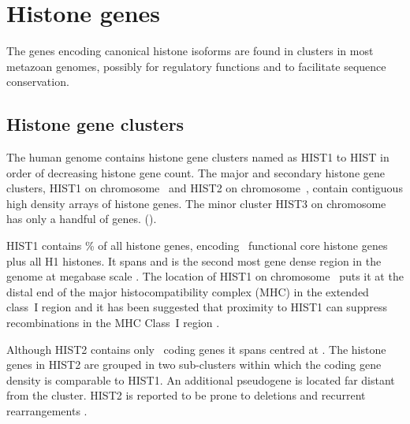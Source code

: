 \section{Histone genes}

  The genes encoding canonical histone isoforms are found in clusters in most metazoan genomes, 
  possibly for regulatory functions and to facilitate sequence conservation.

  \subsection{Histone gene clusters}
    The human genome contains  histone gene clusters 
	named as HIST1 to HIST in order of decreasing histone gene count.
    The major and secondary histone gene clusters,
    HIST1 on chromosome~\HISTOneLocus{} and HIST2 on chromosome~\HISTTwoLocus{},
    contain contiguous high density arrays of histone genes.
	The minor cluster HIST3 on chromosome~\HISTThreeLocus{} has only a handful of genes.
    ().

    HIST1 contains \% of all histone genes, 
	encoding \CodingGenesInHISTOne{}~functional core histone genes plus all H1 histones. 
	It spans \HISTOneSpan{} and is the second most gene dense region in the genome at megabase scale \citep{MHC-III-analysis}. 
	The location of HIST1 on chromosome~\HISTOneLocus{}
	puts it at the distal end of the major histocompatibility complex (MHC) in the extended class~I region \citep{MHC-I-transcript, MHC-complete-sequencing-1999} 
	and it has been suggested that proximity to HIST1 can suppress recombinations in the MHC Class~I region \citep{MHC-repressed-by-HIST}.

    Although HIST2 contains only \CodingGenesInHISTTwo{}~coding genes it spans \HISTTwoSpan{} centred at \HISTTwoLocus{}.
	The histone genes in HIST2 are grouped in two sub-clusters 
	within which the coding gene density is comparable to HIST1.
	An additional pseudogene is located far distant from the cluster.
    HIST2 is reported to be prone to deletions and recurrent rearrangements \citep{HISTTwo-prone-deletion-discovery, HISTTwo-prone-deletion-focus}.

